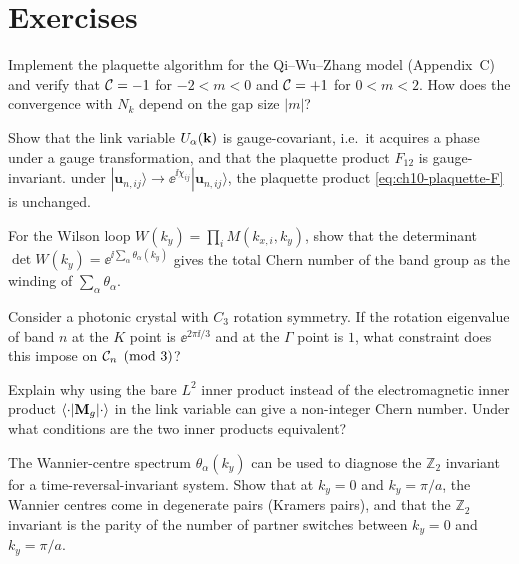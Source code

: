 \section*{Exercises}

\begin{exercise}
  Implement the plaquette algorithm for the Qi--Wu--Zhang model
  (Appendix~C) and verify that $\mathcal{C}=-1$ for $-2<m<0$ and
  $\mathcal{C}=+1$ for $0<m<2$.  How does the convergence with $N_k$
  depend on the gap size $|m|$?
\end{exercise}

\begin{exercise}
  Show that the link variable $U_\alpha(\mathbf{k})$ is gauge-covariant,
  i.e.\ it acquires a phase under a gauge transformation, and that
  the plaquette product $F_{12}$ is gauge-invariant.
  under $|\mathbf{u}_{n,ij}\rangle\to\ee^{\ii\chi_{ij}}
  |\mathbf{u}_{n,ij}\rangle$, the plaquette product \eqref{eq:ch10-plaquette-F}
  is unchanged.
\end{exercise}

\begin{exercise}
  For the Wilson loop $W(k_y)=\prod_i M(k_{x,i},k_y)$, show that the
  determinant $\det W(k_y)=\ee^{\ii\sum_\alpha\theta_\alpha(k_y)}$
  gives the total Chern number of the band group as the winding of
  $\sum_\alpha\theta_\alpha$.
\end{exercise}

\begin{exercise}
  Consider a photonic crystal with $C_3$ rotation symmetry.  If the
  rotation eigenvalue of band $n$ at the $K$ point is $\ee^{2\pi\ii/3}$
  and at the $\Gamma$ point is $1$, what constraint does this impose on
  $\mathcal{C}_n\pmod{3}$?
\end{exercise}

\begin{exercise}
  Explain why using the bare $L^2$ inner product instead of the
  electromagnetic inner product $\langle\cdot|\mathbf{M}_g|\cdot\rangle$
  in the link variable can give a non-integer Chern number.  Under what
  conditions are the two inner products equivalent?
\end{exercise}

\begin{exercise}
  The Wannier-centre spectrum $\theta_\alpha(k_y)$ can be used to
  diagnose the $\mathbb{Z}_2$ invariant for a time-reversal-invariant
  system.  Show that at $k_y=0$ and $k_y=\pi/a$, the Wannier centres
  come in degenerate pairs (Kramers pairs), and that the $\mathbb{Z}_2$
  invariant is the parity of the number of partner switches between
  $k_y=0$ and $k_y=\pi/a$.
\end{exercise}

